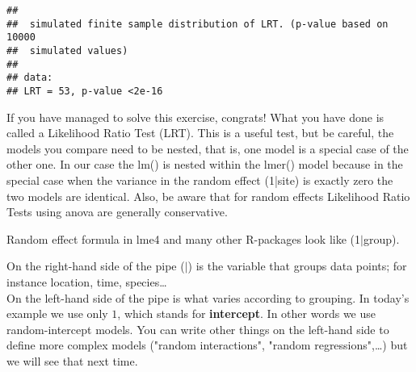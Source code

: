 \documentclass[12pt,a4paper]{scrartcl}\usepackage[]{graphicx}\usepackage[]{color}
\makeatletter
\newenvironment{kframe}{%
 \def\at@end@of@kframe{}%
 \ifinner\ifhmode%
  \def\at@end@of@kframe{\end{minipage}}%
  \begin{minipage}{\columnwidth}%
 \fi\fi%
 \def\FrameCommand##1{\hskip\@totalleftmargin \hskip-\fboxsep
 \colorbox{shadecolor}{##1}\hskip-\fboxsep
     \hskip-\linewidth \hskip-\@totalleftmargin \hskip\columnwidth}%
 \MakeFramed {\advance\hsize-\width
   \@totalleftmargin\z@ \linewidth\hsize
   \@setminipage}}%
 {\par\unskip\endMakeFramed%
 \at@end@of@kframe}
\newenvironment{knitrout}{}{} %
\makeatother
\begin{document}
\begin{Answer}
\begin{knitrout}
\begin{kframe}
{\ttfamily\noindent\itshape\color{messagecolor}{\#\# No restrictions on fixed effects. REML-based inference preferable.}}

{\ttfamily\noindent\itshape\color{messagecolor}{\#\# Using likelihood evaluated at REML estimators.}}

{\ttfamily\noindent\itshape{}}\begin{verbatim}
## 
## 	simulated finite sample distribution of LRT. (p-value based on 10000
## 	simulated values)
## 
## data:  
## LRT = 53, p-value <2e-16
\end{verbatim}
\end{kframe}
\end{knitrout}

\end{Answer}
If you have managed to solve this exercise, congrats! What you have done is called a Likelihood Ratio Test (LRT). This is a useful test, but be careful, the models you compare need to be nested, that is, one model is a special case of the other one. In our case the lm() is nested within the lmer() model because in the special case when the variance in the random effect (1|site) is exactly zero the two models are identical.
Also, be aware that for random effects Likelihood Ratio Tests using anova are generally conservative.



\begin{tcolorbox}[colback=green!5,colframe=green!40!black,title=How does random effect formula work again?]
Random effect formula in lme4 and many other R-packages look like (1$|$group).

On the right-hand side of the pipe ($|$) is the variable that groups data points; for instance location, time, species\dots \\

On the left-hand side of the pipe is what varies according to grouping. In today's example we use only $1$, which stands for \textbf{intercept}. In other words we use random-intercept models. You can write other things on the left-hand side to define more complex models ("random interactions", "random regressions",\dots) but we will see that next time.

\end{tcolorbox}
\end{document}
